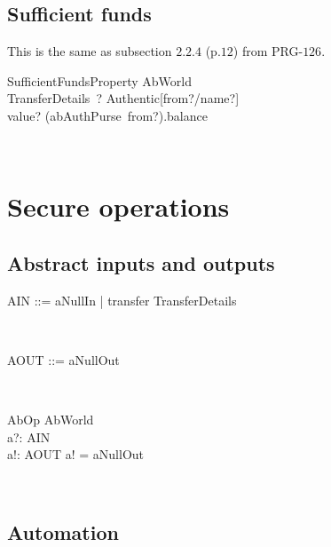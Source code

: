 \subsection{Sufficient funds}

This is the same as subsection $2.2.4$ (p.$12$) from PRG-$126$.
\begin{LSDef}
\begin{schema}{SufficientFundsProperty}
  AbWorld\\
  TransferDetails~?
\where
  Authentic[from?/name?]\\
  value? \leq  (abAuthPurse~from?).balance
\end{schema}~\end{LSDef}

\section{Secure operations}\label{ch3.secure.op}

\subsection{Abstract inputs and outputs}

\begin{LFType}
\begin{zed}
  AIN ::= aNullIn | transfer \ldata TransferDetails \rdata
\end{zed}~\end{LFType}

\begin{LFType}
\begin{zed}
  AOUT ::= aNullOut
\end{zed}~\end{LFType}

\begin{LSDef}
\begin{schema}{AbOp}
  \Delta AbWorld\\
  a?: AIN\\
  a!: AOUT
\where
  a! = aNullOut
\end{schema}~\end{LSDef}

\subsection*{Automation}


